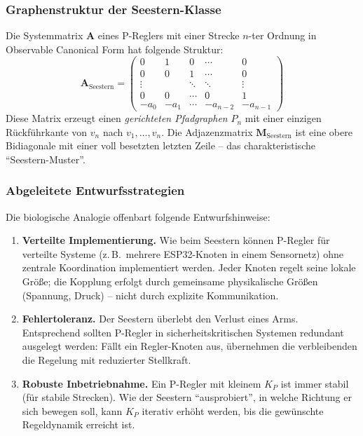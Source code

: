 \documentclass[a4paper,12pt]{article}
\theoremstyle{definition}
\begin{document}
\subsubsection{Graphenstruktur der Seestern-Klasse}

Die Systemmatrix $\mathbf{A}$ eines P-Reglers mit einer Strecke $n$-ter Ordnung
in Observable Canonical Form hat folgende Struktur:
\[
\mathbf{A}_{\text{Seestern}} =
\begin{pmatrix}
	0      & 1      & 0      & \cdots & 0      \\
	0      & 0      & 1      & \cdots & 0      \\
	\vdots &        & \ddots & \ddots & \vdots \\
	0      & 0      & \cdots & 0      & 1      \\
	-a_0   & -a_1   & \cdots & -a_{n-2} & -a_{n-1}
\end{pmatrix}
\]
Diese Matrix erzeugt einen \emph{gerichteten Pfadgraphen} $P_n$ mit einer
einzigen Rückführkante von $v_n$ nach $v_1, \ldots, v_n$. Die Adjazenzmatrix
$\mathbf{M}_{\text{Seestern}}$ ist eine obere Bidiagonale mit einer voll besetzten
letzten Zeile -- das charakteristische ``Seestern-Muster''.

\subsubsection{Abgeleitete Entwurfsstrategien}

Die biologische Analogie offenbart folgende Entwurfshinweise:

\begin{enumerate}
	\item \textbf{Verteilte Implementierung.} Wie beim Seestern können P-Regler
	für verteilte Systeme (z.\,B.\ mehrere ESP32-Knoten in einem Sensornetz)
	ohne zentrale Koordination implementiert werden. Jeder Knoten regelt
	seine lokale Größe; die Kopplung erfolgt durch gemeinsame physikalische
	Größen (Spannung, Druck) -- nicht durch explizite Kommunikation.
	\item \textbf{Fehlertoleranz.} Der Seestern überlebt den Verlust eines Arms.
	Entsprechend sollten P-Regler in sicherheitskritischen Systemen
	redundant ausgelegt werden: Fällt ein Regler-Knoten aus, übernehmen
	die verbleibenden die Regelung mit reduzierter Stellkraft.
	\item \textbf{Robuste Inbetriebnahme.} Ein P-Regler mit kleinem $K_P$ ist
	immer stabil (für stabile Strecken). Wie der Seestern ``ausprobiert'',
	in welche Richtung er sich bewegen soll, kann $K_P$ iterativ erhöht
	werden, bis die gewünschte Regeldynamik erreicht ist.
\end{enumerate}
\end{document}
